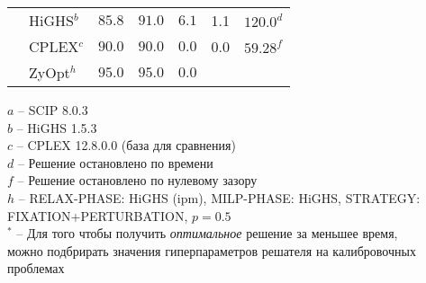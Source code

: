 \documentclass[%
	11pt,
	a4paper,
	utf8,
		]{article}
\begin{document}
\begin{landscape}
{\begin{table}[!h]
\begin{tabular}{ p{3.3cm} | p{1.8cm} | p{1.8cm} | p{1.8cm} | p{1.6cm} | p{2.6cm} | p{2.5cm}}
			\rowcolor{blue!3}{$ - $} & HiGHS$^b $ & $ 85.8 $ & $ 91.0 $ & $ 6.1 $ & 1.1 & $ 120.0^d $ \\
			\rowcolor{black!5}{$ - $} & CPLEX$^c $& $ 90.0 $ & $ 90.0 $ & $ 0.0 $ & 0.0 & $ 59.28^f $ \\
			\rowcolor{blue!3}{$ - $} & ZyOpt$ ^h $ & $ 95.0 $ & $ 95.0 $ & $ 0.0 $ & \ccb{$ -5.6^* $} & \ccg{$ 0.19^f (+99.7\%) $} \\
		\end{tabular}		
	\end{table}
    \vspace*{-3mm}
\hspace*{5mm}$ a $ -- {\footnotesize SCIP 8.0.3}\\[-7mm]

\hspace*{5mm}$ b $ -- {\footnotesize HiGHS 1.5.3}\\[-7mm]

\hspace*{5mm}$ c $ -- {\footnotesize CPLEX 12.8.0.0 (база для сравнения)}\\[-7mm]

\hspace*{5mm}$ d $ -- {\footnotesize Решение остановлено по времени}\\[-7mm]

\hspace*{5mm}$ f $ -- {\footnotesize Решение остановлено по нулевому зазору }\\[-6mm]

\hspace*{5mm}$ h $ -- {\footnotesize RELAX-PHASE: HiGHS (ipm), MILP-PHASE: HiGHS, STRATEGY: FIXATION+PERTURBATION, $ p = 0.5 $}\\[-6mm]

\hspace*{5mm}$ {}^* $ -- {\footnotesize Для того чтобы получить \emph{оптимальное} решение за меньшее время, \\[-6mm]
	
\hspace*{11mm}можно подбрирать значения гиперпараметров решателя на калибровочных проблемах }\\[-7mm]
}
\end{landscape}





\newpage 
\end{document}
